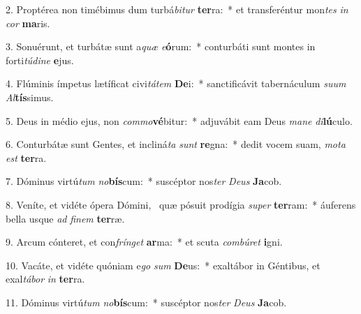 2. Proptérea non timébimus dum turbá\textit{bi}\textit{tur} \textbf{ter}ra:~*  et transferéntur mon\textit{tes} \textit{in} \textit{cor} \textbf{ma}ris.\

3. Sonuérunt, et turbátæ sunt a\textit{quæ} \textit{e}\textbf{ó}rum:~*  conturbáti sunt montes in forti\textit{tú}\textit{di}\textit{ne} \textbf{e}jus.\

4. Flúminis ímpetus lætíficat civi\textit{tá}\textit{tem} \textbf{De}i:~*  sanctificávit tabernáculum \textit{su}\textit{um} \textit{Al}\textbf{tís}simus.\

5. Deus in médio ejus, non \textit{com}\textit{mo}\textbf{vé}bitur:~*  adjuvábit eam Deus \textit{ma}\textit{ne} \textit{di}\textbf{lú}culo.\

6. Conturbátæ sunt Gentes, et incliná\textit{ta} \textit{sunt} \textbf{re}gna:~*  dedit vocem suam, \textit{mo}\textit{ta} \textit{est} \textbf{ter}ra.\

7. Dóminus virtú\textit{tum} \textit{no}\textbf{bís}cum:~*  suscéptor nos\textit{ter} \textit{De}\textit{us} \textbf{Ja}cob.\

8. Veníte, et vidéte ópera Dómini, \dag\  quæ pósuit prodígia \textit{su}\textit{per} \textbf{ter}ram:~*  áuferens bella usque \textit{ad} \textit{fi}\textit{nem} \textbf{ter}ræ.\

9. Arcum cónteret, et con\textit{frín}\textit{get} \textbf{ar}ma:~*  et scuta \textit{com}\textit{bú}\textit{ret} \textbf{i}gni.\

10. Vacáte, et vidéte quóniam e\textit{go} \textit{sum} \textbf{De}us:~*  exaltábor in Géntibus, et exal\textit{tá}\textit{bor} \textit{in} \textbf{ter}ra.\

11. Dóminus virtú\textit{tum} \textit{no}\textbf{bís}cum:~*  suscéptor nos\textit{ter} \textit{De}\textit{us} \textbf{Ja}cob.\

